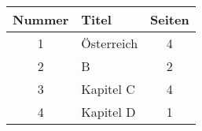 \begin{tabular}{|c|l|c|}\hline
Nummer & Titel & Seiten \\\hline\hline
1 & ^^d6sterreich & 4 \\
2 & B & 2 \\
3 & Kapitel C & 4 \\
4 & Kapitel D & 1 \\
\hline
\end{tabular}

